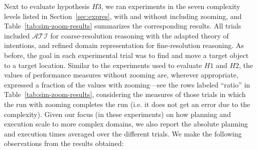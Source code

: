 \documentclass[11pt, oneside]{article}
\begin{document}
Next to evaluate hypothesis $H3$, we ran experiments in the seven
complexity levels listed in Section~\ref{sec:expres}, with and without
including zooming, and Table~\ref{tab:sim-zoom-results} summarizes the
corresponding results. All trials included $\mathcal{ATI}$ for
coarse-resolution reasoning with the adapted theory of intentions, and
refined domain representation for fine-resolution reasoning. As
before, the goal in each experimental trial was to find and move a
target object to a target location. Similar to the experiments used to
evaluate $H1$ and $H2$, the values of performance measures without
zooming are, wherever appropriate, expressed a fraction of the values
with zooming---see the rows labeled ``ratio'' in
Table~\ref{tab:sim-zoom-results}, considering the measures of those trials in which the run with zooming completes the run (i.e. it does not get an error due to the complexity).  Given our focus (in these
experiments) on how planning and execution scale to more complex
domains, we also report the absolute planning and execution times
averaged over the different trials. We make the following observations
from the results obtained:
\end{document}
